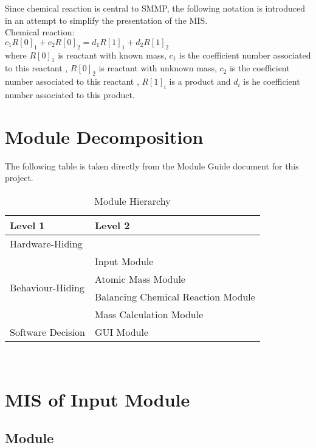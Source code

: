 \documentclass[12pt, titlepage]{article}
\begin{document}
\noindent
Since chemical reaction is central to SMMP, the following notation
is introduced in an attempt to simplify the presentation of the MIS.\\

\noindent
Chemical reaction:\\

$c_1R[0]_1 + c_2R[0]_2 = d_1R[1]_1 + d_2R[1]_2$\\

where $R[0]_1$ is reactant with known mass, $c_1$ is the coefficient number associated to this reactant ,
$R[0]_2$  is reactant with unknown mass, $c_2$ is the coefficient number associated to this reactant , 
$R[1]_i$ is a product and  $d_i$ is he coefficient number associated to this product.

\section{Module Decomposition}

The following table is taken directly from the Module Guide document for this project.

\begin{table}[h!]
\centering
\begin{tabular}{p{} p{}}
\toprule
\textbf{Level 1} & \textbf{Level 2}\\
\midrule

{Hardware-Hiding} & ~ \\
\midrule

\multirow{4}{0.3\textwidth}{Behaviour-Hiding}  &Input Module \\
& Atomic Mass Module\\
&Balancing Chemical Reaction Module\\
& Mass Calculation Module\\
\midrule

\multirow{1}{0.3\textwidth}{Software Decision} & GUI Module\\
\bottomrule

\end{tabular}
\caption{Module Hierarchy}
\label{TblMH}
\end{table}


~\newpage

\section{MIS of Input Module} \label{input} 

\subsection{Module}
\end{document}

